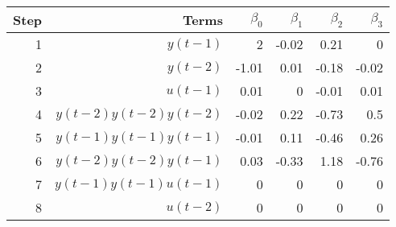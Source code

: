 \begin{tabular}{rrrrrr}
Step & Terms & $\beta_{0}$ & $\beta_{1}$ & $\beta_{2}$ & $\beta_{3}$ \\ 
\hline 
1 & $y(t-1)$ & 2 & -0.02 & 0.21 & 0 \\ 
2 & $y(t-2)$ & -1.01 & 0.01 & -0.18 & -0.02 \\ 
3 & $u(t-1)$ & 0.01 & 0 & -0.01 & 0.01 \\ 
4 & $y(t-2)y(t-2)y(t-2)$ & -0.02 & 0.22 & -0.73 & 0.5 \\ 
5 & $y(t-1)y(t-1)y(t-1)$ & -0.01 & 0.11 & -0.46 & 0.26 \\ 
6 & $y(t-2)y(t-2)y(t-1)$ & 0.03 & -0.33 & 1.18 & -0.76 \\ 
7 & $y(t-1)y(t-1)u(t-1)$ & 0 & 0 & 0 & 0 \\ 
8 & $u(t-2)$ & 0 & 0 & 0 & 0 \\ 
\hline 
\end{tabular}